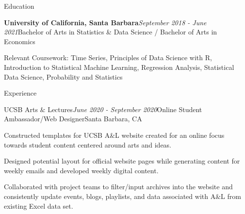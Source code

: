 \documentclass{resume} %
\begin{document}
\begin{rSection}{Education}

\begin{rSubsection}{\bf University of California, Santa Barbara}{\em September 2018 - June 2021}{Bachelor of Arts in Statistics \& Data Science / Bachelor of Arts in Economics}{}
\item Relevant Coursework: Time Series, Principles of Data Science with R, Introduction to Statistical Machine Learning, Regression Analysis, Statistical Data Science, Probability and Statistics
\end{rSubsection}

\end{rSection}


\begin{rSection}{Experience}

\begin{rSubsection}{UCSB Arts $\&$ Lectures}{\em June 2020 -  September 2020}{Online Student Ambassador/Web Designer}{Santa Barbara, CA}
\item Constructed templates for UCSB A$\&$L website created for an online focus towards student content centered around arts and ideas. 
\item Designed potential layout for official website pages while generating content for weekly emails and developed weekly digital content.
\item Collaborated with project teams to filter/input archives into the website and consistently update events, blogs, playlists, and data associated with A$\&$L from existing Excel data set.
\end{rSubsection}

\end{rSection}






\end{document}
